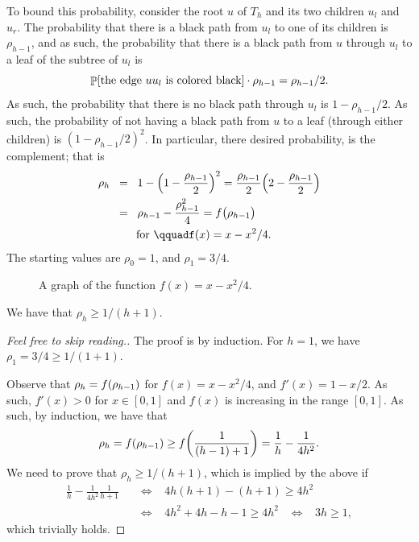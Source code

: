 To bound this probability, consider the root $u$ of $T_h$ and its two
children $u_l$ and $u_r$. The probability that there is a black path
from $u_l$ to one of its children is $\rho_{h-1}$, and as such, the
probability that there is a black path from $u$ through $u_l$ to a
leaf of the subtree of $u_l$ is
\begin{equation*}
    \Prob{\text{the edge } \MakeSBig u {}
       u_l \text{ is colored black}} \cdot \rho_{h-1} = \rho_{h-1}/2.
\end{equation*}
As such, the probability that there is no black path through $u_l$ is
$1-\rho_{h-1}/2$. As such, the probability of not having a black path from
$u$ to a leaf (through either children) is $(1-\rho_{h-1}/2)^2$. In
particular, there desired probability, is the complement; that is
\begin{align*}
    \rho_h%
    &\EQ%
    1 - \pth{1-\frac{\rho_{h-1}}{2}}^2 %
    =%
    \frac{\rho_{h-1}}{2} \pth{2-\frac{\rho_{h-1}}{2}}
    \\&
    \EQ%
    \rho_{h-1} -
    \frac{\rho_{h-1}^2}{4} = f \bigl( \rho_{h-1} \bigr)
    \\
    &\qquad
    \text{ for }
    \qquad%
    f(x) = x -x^2/4.
\end{align*}
The starting values are $\rho_0 = 1$, and $\rho_1 = 3/4$.

\begin{figure}[h]
    \centerline{%
    }
    \caption{A graph of the function $f(x) = x -x^2/4$.}
\end{figure}

\begin{lemma}
    We have that $\rho_h \geq 1/(h+1)$.
\end{lemma}
\begin{proof}[Feel free to skip reading.]
    The proof is by induction. For $h=1$, we have
    $\rho_1 = 3/4 \geq 1/(1+1)$.
    
    Observe that $\rho_h = f\pth{\rho_{h-1} }$ for $f(x) = x -x^2/4$,
    and $f'(x) = 1-x/2$. As such, $f'(x) > 0$ for $x\in[0,1]$ and
    $f(x)$ is increasing in the range $[0,1]$. As such, by induction,
    we have that
    \begin{equation*}
        \ds \rho_h = f\pth[]{ \rho_{h-1}} \geq f\pth[]{
           \frac{1}{(h-1)+1}} = \frac{1}{h} - \frac{1}{4 h^2}.        
    \end{equation*}
    We need
    to prove that $\rho_h \geq 1/(h+1)$, which is implied by the above
    if
    \begin{align*}
        \frac{1}{h} - \frac{1}{4 h^2}
        \frac{1}{h+1}
        &%
        \;\;\;\Leftrightarrow \;\;\;
        4h(h+1) - (h+1) \geq 4h^2
        \\&
        \;\;\;\Leftrightarrow \;\;\;%
        4h^2 +4h - h- 1 \geq 4h^2
        \;\;\;\Leftrightarrow \;\;\; 3h \geq 1,
    \end{align*}
    which trivially holds.
\end{proof}


